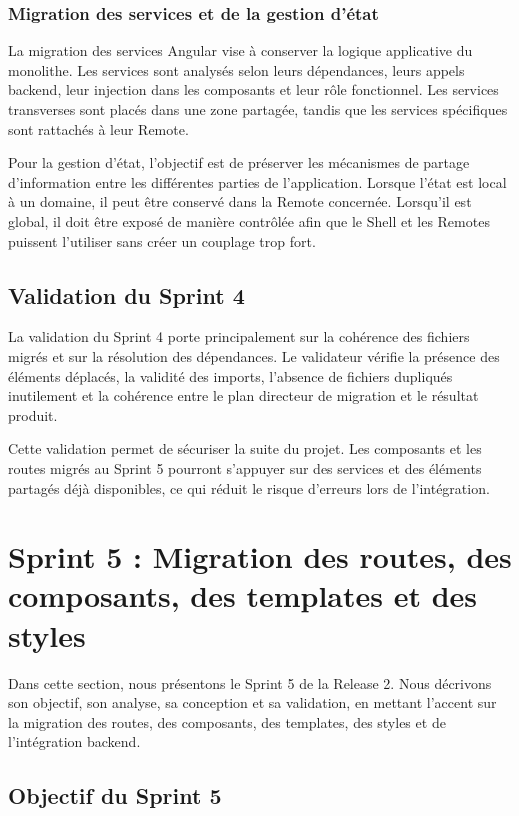 \subsubsection{Migration des services et de la gestion d'état}

La migration des services Angular vise à conserver la logique applicative du monolithe. Les services sont analysés selon leurs dépendances, leurs appels backend, leur injection dans les composants et leur rôle fonctionnel. Les services transverses sont placés dans une zone partagée, tandis que les services spécifiques sont rattachés à leur Remote.

Pour la gestion d'état, l'objectif est de préserver les mécanismes de partage d'information entre les différentes parties de l'application. Lorsque l'état est local à un domaine, il peut être conservé dans la Remote concernée. Lorsqu'il est global, il doit être exposé de manière contrôlée afin que le Shell et les Remotes puissent l'utiliser sans créer un couplage trop fort.

\subsection{Validation du Sprint 4}

La validation du Sprint 4 porte principalement sur la cohérence des fichiers migrés et sur la résolution des dépendances. Le validateur vérifie la présence des éléments déplacés, la validité des imports, l'absence de fichiers dupliqués inutilement et la cohérence entre le plan directeur de migration et le résultat produit.

Cette validation permet de sécuriser la suite du projet. Les composants et les routes migrés au Sprint 5 pourront s'appuyer sur des services et des éléments partagés déjà disponibles, ce qui réduit le risque d'erreurs lors de l'intégration.

\section{Sprint 5 : Migration des routes, des composants, des templates et des styles}

Dans cette section, nous présentons le Sprint 5 de la Release 2. Nous décrivons son objectif, son analyse, sa conception et sa validation, en mettant l'accent sur la migration des routes, des composants, des templates, des styles et de l'intégration backend.

\subsection{Objectif du Sprint 5}

